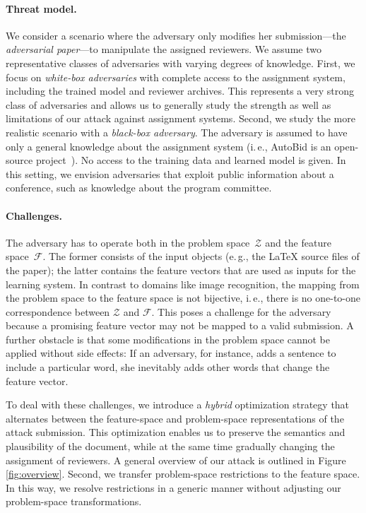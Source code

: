 \documentclass[letterpaper,twocolumn,10pt]{article}
\newcommand{\ie}{i.\,e.}
\newcommand{\eg}{e.\,g.}
\newcommand{\Dom}{\ensuremath{\mathcal{Z}}\xspace}
\newcommand{\F}{\ensuremath{\mathcal{F}}\xspace}
\begin{document}
\paragraph{Threat model.}
We consider a scenario where the adversary only modifies her submission---the \emph{adversarial paper}---to manipulate the assigned reviewers. We assume two representative classes of adversaries with varying degrees of knowledge.
First, we focus on \emph{white-box adversaries} with complete access to the assignment system, including the trained model and reviewer archives. This represents a very strong class of adversaries and allows us to generally study the strength as well as limitations of our attack against assignment systems.
Second, we study the more realistic scenario with a \emph{black-box adversary}. The adversary is assumed to have only a general knowledge about the assignment system (\ie, AutoBid is an open-source project~\cite{misc-autobid}). No access to the training data and learned model is given. In this setting, we envision adversaries that exploit public information about a conference, such as knowledge about the program committee.

\paragraph{Challenges.}
The adversary has to operate both in the problem space~\Dom and the feature space~\F. The former consists of the input objects (\eg{}, the \LaTeX{} source files of the paper); the latter contains the feature vectors that are used as inputs for the learning system. In contrast to domains like image recognition, the mapping from the problem space to the feature space is not bijective, \ie{}, there is no one-to-one correspondence between \Dom and \F. This poses a challenge for the adversary because a promising feature vector may not be mapped to a valid submission. A further obstacle is that some modifications in the problem space cannot be applied without side effects: If an adversary, for instance, adds a sentence  to include a particular word, she inevitably adds other words that change the feature vector. 

To deal with these challenges, we introduce a \emph{hybrid} optimization strategy that alternates between the feature-space and problem-space representations of the attack submission.
This optimization enables us to preserve the semantics and plausibility of the document, while at the same time gradually changing the assignment of reviewers. A general overview of our attack is outlined in Figure \ref{fig:overview}.
Second, we transfer problem-space restrictions to the feature space. In this way, we resolve restrictions in a generic manner without adjusting our problem-space transformations.
\end{document}
